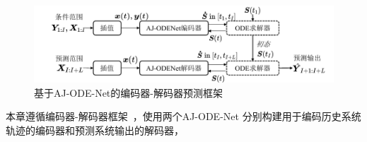 
\begin{figure}[htb]
    \centering
    \includegraphics[width=1.0\linewidth]{figures/chapter4/Jump-ODEnet_flow.pdf}
     \caption{基于AJ-ODE-Net的编码器-解码器预测框架}
    \label{fig:AJ-ODE-Net_framework}
\end{figure}
本章遵循编码器-解码器框架~\cite{du2020multivariate,yuan2020dual}，使用两个AJ-ODE-Net
分别构建用于编码历史系统轨迹的编码器和预测系统输出的解码器，
